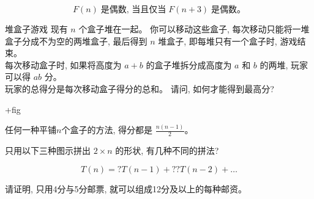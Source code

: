 
\begin{frame}{}
  \begin{exampleblock}{}
    \[
      F(n) \;\text{是偶数, 当且仅当}\; F(n+3) \;\text{是偶数。}
    \]
  \end{exampleblock}
\end{frame}

\begin{frame}{}
  \begin{exampleblock}{堆盒子游戏}
    现有 $n$ 个盒子堆在一起。
    你可以移动这些盒子, 每次移动只能将一堆盒子分成不为空的两堆盒子,
    最后得到 $n$ 堆盒子, 即每堆只有一个盒子时, 游戏结束。 \\[8pt]
    每次移动盒子时, 如果将高度为 $a + b$ 的盒子堆拆分成高度为 $a$ 和 $b$ 的两堆,
    玩家可以得 $ab$ 分。 \\[8pt]
    玩家的总得分是每次移动盒子得分的总和。
    请问, 如何才能得到最高分?
  \end{exampleblock}

  +fig
\end{frame}

\begin{frame}{}
  \begin{lemma}{}
    任何一种平铺$n$个盒子的方法, 得分都是 $\frac{n(n-1)}{2}$。
  \end{lemma}
\end{frame}

\begin{frame}{}
  \begin{exampleblock}{}
    只用以下三种图示拼出 $2 \times n$ 的形状, 有几种不同的拼法?
  \end{exampleblock}

  \[
    T(n) = ? T(n-1) + ?? T(n-2) + \dots
  \]
\end{frame}

\begin{frame}{}
  \begin{exampleblock}{}
    请证明, 只用4分与5分邮票, 就可以组成12分及以上的每种邮资。
  \end{exampleblock}
\end{frame}
